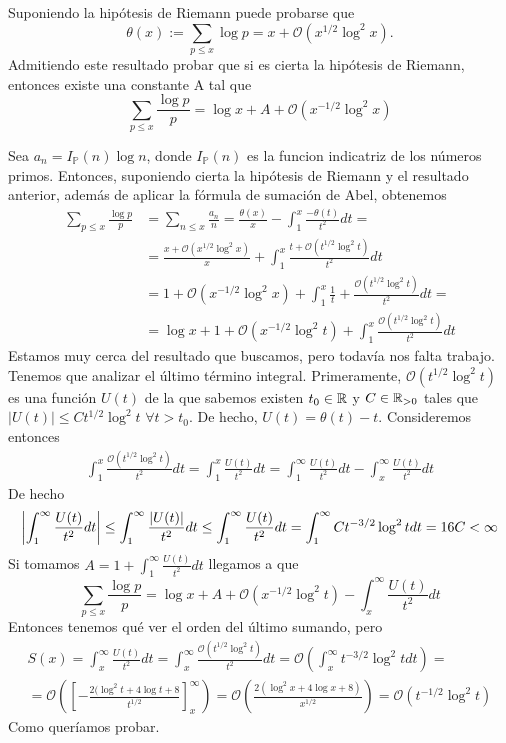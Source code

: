 \documentclass[twoside]{article}
\providecommand{\bo}[1]{\mathcal{O}\left(#1\right)}
\begin{document}
\begin{ejercicio}{12}
Suponiendo la hipótesis de Riemann puede probarse que
$$
\theta(x):=\sum_{p\leq x}\log p = x + \mathcal{O}(x^{1/2}\log^2x).
$$
Admitiendo este resultado probar que si es cierta la hipótesis de Riemann, entonces existe una constante A tal que
$$
\sum_{p\leq x}\frac{\log p}{p} = \log x + A + \mathcal{O}(x^{-1/2}\log^2 x)
$$
\begin{solucion}
Sea $a_n = I_{\mathbb{P}}(n)\log n$, donde $I_{\mathbb{P}}(n)$ es la funcion indicatriz de los números primos. Entonces, suponiendo cierta la hipótesis de Riemann y el resultado anterior, además de aplicar la fórmula de sumación de Abel, obtenemos
\begin{align*}
\sum_{p\leq x}\frac{\log p}{p} &= \sum_{n\leq x}\frac{a_n}{n} = \frac{\theta(x)}{x} - \int_1^x \frac{-\theta(t)}{t^2}dt =\\
&= \frac{x + \mathcal{O}(x^{1/2}\log^2x)}{x} + \int_1^x \frac{t + \mathcal{O}(t^{1/2}\log^2t)}{t^2}dt\\
 &= 1+\mathcal{O}(x^{-1/2}\log^2 x) + \int_1^x \frac{1}{t} + \frac{\mathcal{O}(t^{1/2}\log^2 t)}{t^2}dt =\\
&=\log x + 1 + \mathcal{O}(x^{-1/2}\log^2 t)  + \int_1^x \frac{\mathcal{O}(t^{1/2}\log^2 t)}{t^2}dt
\end{align*}
Estamos muy cerca del resultado que buscamos, pero todavía nos falta trabajo. Tenemos que analizar el último término integral. Primeramente, $\mathcal{O}(t^{1/2}\log^2 t)$ es una función $U(t)$ de la que sabemos existen $t_0 \in \mathbb{R}$ y $C\in\mathbb{R}_{>0}$ tales que $|U(t)|\leq Ct^{1/2}\log^2 t$ $\forall t>t_0$. De hecho, $U(t)=\theta(t)-t$. Consideremos entonces
\begin{gather*}
\int_1^x \frac{\mathcal{O}(t^{1/2}\log^2 t)}{t^2}dt = \int_1^x \frac{U(t)}{t^2}dt = \int_1^\infty \frac{U(t)}{t^2}dt - \int_x^\infty \frac{U(t)}{t^2}dt
\end{gather*}
De hecho
$$
\left|{\int_1^\infty \frac{U(t)}{t^2}dt}\right| \leq \int_1^\infty \frac{\left|{U(t)}\right|}{t^2}dt \leq \int_1^\infty \frac{U(t)}{t^2}dt =\int_1^\infty  Ct^{-3/2}\log^2 t dt =16C<\infty
$$ Si tomamos $A = 1 + \int_1^\infty \frac{U(t)}{t^2}dt$ llegamos a que
$$
\sum_{p\leq x}\frac{\log p}{p} = \log x + A + \mathcal{O}(x^{-1/2}\log^2 t) - \int_x^\infty \frac{U(t)}{t^2}dt
$$
Entonces tenemos qué ver el orden del último sumando, pero
\begin{gather*}
S(x)= \int_x^\infty \frac{U(t)}{t^2}dt = \int_x^\infty \frac{\mathcal{O}(t^{1/2}\log^2 t)}{t^2}dt = \bo{\int_x^\infty  {t^{-3/2}\log^2 t}dt}=\\
=\bo{\left[-\frac{2(\log^2 t+4\log t + 8}{t^{1/2}}\right]_x^\infty }= \bo{\frac{2(\log^2 x+4\log x + 8)}{x^{1/2}}} = \mathcal{O}(t^{-1/2}\log^2 t)
\end{gather*}
Como queríamos probar.
\end{solucion}
\end{ejercicio}
\end{document}
